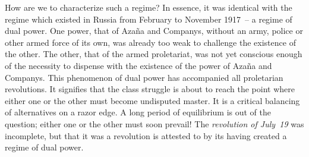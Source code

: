 How are we to characterize such a regime? In essence, it was identical with the regime which existed in Russia from February to November 1917~-- a regime of dual power. One power, that of Azaña and Companys, without an army, police or other armed force of its own, was already too weak to challenge the existence of the other. The other, that of the armed proletariat, was not yet conscious enough of the necessity to dispense with the existence of the power of Azaña and Companys. This phenomenon of dual power has accompanied all proletarian revolutions. It signifies that the class struggle is about to reach the point where either one or the other must become undisputed master. It is a critical balancing of alternatives on a razor edge. A long period of equilibrium is out of the question; either one or the other must soon prevail! The \emph{revolution of July~19} was incomplete, but that it was a revolution is attested to by its having created a regime of dual power.